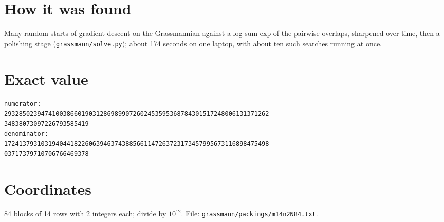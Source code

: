 \documentclass[11pt,a4paper]{article}
\begin{document}
\section{How it was found}
Many random starts of gradient descent on the Grassmannian against a log-sum-exp of the pairwise overlaps, sharpened over time, then a polishing stage (\texttt{grassmann/solve.py}); about 174 seconds on one laptop, with about ten such searches running at once.


\appendix
\section{Exact value}
{\small
\begin{verbatim}
numerator:
293285023947410038660190312869899072602453595368784301517248006131371262
34838073097226793585419
denominator:
172413793103194044182260639463743885661147263723173457995673116898475498
03717379710706766469378
\end{verbatim}}

\section{Coordinates}
84 blocks of 14 rows with 2 integers each; divide by $10^{12}$. File: \texttt{grassmann/packings/m14n2N84.txt}.
{\tiny
\begin{multicols}{4}
\end{multicols}}
\end{document}
